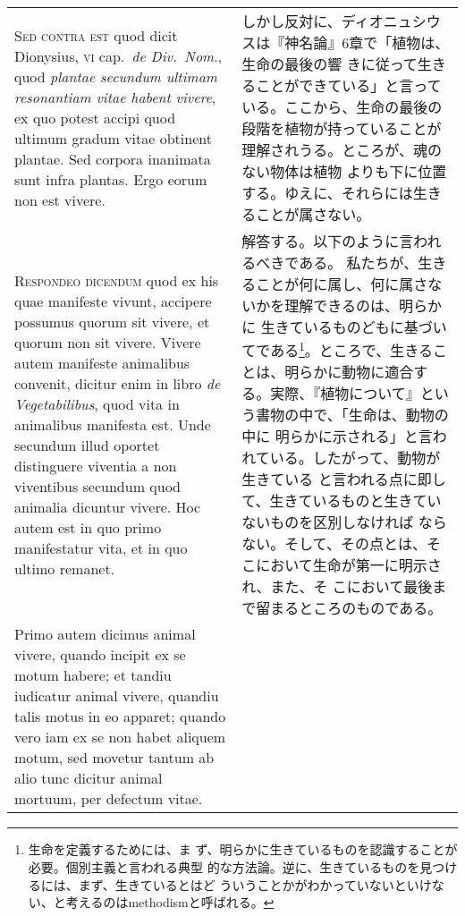 \documentclass[10pt]{jsarticle} %
\begin{document}
\begin{longtable}{p{21em}p{21em}}
\\



{\scshape  Sed contra est} quod dicit Dionysius, {\scshape vi} cap.~{\itshape de Div.~Nom}.,
 quod {\itshape plantae secundum ultimam resonantiam vitae habent vivere}, ex quo
 potest accipi quod ultimum gradum vitae obtinent plantae. Sed corpora
 inanimata sunt infra plantas. Ergo eorum non est vivere.
 
&

しかし反対に、ディオニュシウスは『神名論』6章で「植物は、生命の最後の響
 きに従って生きることができている」と言っている。ここから、生命の最後の
 段階を植物が持っていることが理解されうる。ところが、魂のない物体は植物
 よりも下に位置する。ゆえに、それらには生きることが属さない。

\\



{\scshape Respondeo dicendum} quod ex his quae manifeste vivunt,
 accipere possumus quorum sit vivere, et quorum non sit vivere. Vivere
 autem manifeste animalibus convenit, dicitur enim in libro {\itshape de
 Vegetabilibus}, quod vita in animalibus manifesta est. Unde secundum
 illud oportet distinguere viventia a non viventibus secundum quod
 animalia dicuntur vivere. Hoc autem est in quo primo manifestatur vita,
 et in quo ultimo remanet.

 
&

解答する。以下のように言われるべきである。
私たちが、生きることが何に属し、何に属さないかを理解できるのは、明らかに
 生きているものどもに基づいてである\footnote{生命を定義するためには、ま
 ず、明らかに生きているものを認識することが必要。個別主義と言われる典型
 的な方法論。逆に、生きているものを見つけるには、まず、生きているとはど
 ういうことかがわかっていないといけない、と考えるのはmethodismと呼ばれる。}。ところで、生きることは、明らかに動物に適合す
 る。実際、『植物について』という書物の中で、「生命は、動物の中に
 明らかに示される」と言われている。したがって、動物が生きている
 と言われる点に即して、生きているものと生きていないものを区別しなければ
 ならない。そして、その点とは、そこにおいて生命が第一に明示され、また、そ
 こにおいて最後まで留まるところのものである。

\\



 Primo autem dicimus animal vivere, quando
 incipit ex se motum habere; et tandiu iudicatur animal vivere, quandiu
 talis motus in eo apparet; quando vero iam ex se non habet aliquem
 motum, sed movetur tantum ab alio tunc dicitur animal mortuum, per
 defectum vitae. 


\end{longtable}
\end{document}
